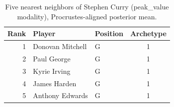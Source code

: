 \begin{table}[htbp]
  \centering\small
  \begin{tabular}{rllc}
    \toprule
    Rank & Player & Position & Archetype \\
    \midrule
    1 & Donovan Mitchell & G & 1 \\
    2 & Paul George & G & 1 \\
    3 & Kyrie Irving & G & 1 \\
    4 & James Harden & G & 1 \\
    5 & Anthony Edwards & G & 1 \\
    \bottomrule
  \end{tabular}
  \caption{Five nearest neighbors of Stephen Curry (peak_value modality), Procrustes-aligned posterior mean.}
  \label{tab:Stephen_Curry_neighbors_peak_value}
\end{table}

